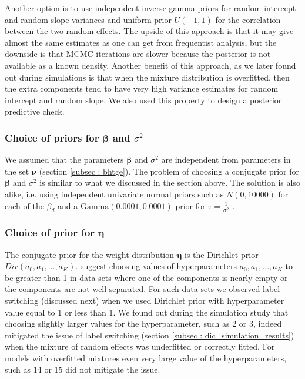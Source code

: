 Another option is to use independent inverse gamma priors for random intercept and random slope variances and uniform prior $U(-1,1)$ for the correlation between the two random effects. The upside of this approach is that it may give almost the same estimates as one can get from frequentist analysis, but the downside is that MCMC iterations are slower because the posterior is not available as a known density. Another benefit of this approach, as we later found out during simulations is that when the mixture distribution is overfitted, then the extra components tend to have very high variance estimates for random intercept and random slope. We also used this property to design a posterior predictive check.

\subsubsection{Choice of priors for $\boldsymbol{\beta}$ and $\sigma^2$}
We assumed that the parameters $\boldsymbol{\beta}$ and $\sigma^2$ are independent from parameters in the set $\boldsymbol{\nu}$ (section \ref{subsec : bhtge}). The problem of choosing a conjugate prior for $\boldsymbol{\beta}$ and $\sigma^2$ is similar to what we discussed in the section above. The solution is also alike, i.e. using independent univariate normal priors such as $N(0, 10000)$ for each of the $\beta_d$ and a $\text{Gamma}(0.0001, 0.0001)$ prior for $\tau = \frac 1 {\sigma^2}$ \citep[chap. 17]{gelman_data_2006}.

\subsubsection{Choice of prior for $\boldsymbol{\eta}$}
The conjugate prior for the weight distribution $\boldsymbol{\eta}$ is the Dirichlet prior $Dir(a_0, a_1,..., a_K)$. \citet[pg. 105]{fruhwirth-schnatter_finite_2013} suggest choosing values of hyperparameters $a_0, a_1,..., a_K$ to be greater than 1 in data sets where one of the components is nearly empty or the components are not well separated. For such data sets we observed label switching (discussed next) when we used Dirichlet prior with hyperparameter value equal to 1 or less than 1. We found out during the simulation study that choosing slightly larger values for the hyperparameter, such as 2 or 3, indeed mitigated the issue of label switching (section \ref{subsec : dic_simulation_results}) when the mixture of random effects was underfitted or correctly fitted. For models with overfitted mixtures even very large value of the hyperparameters, such as 14 or 15 did not mitigate the issue.

